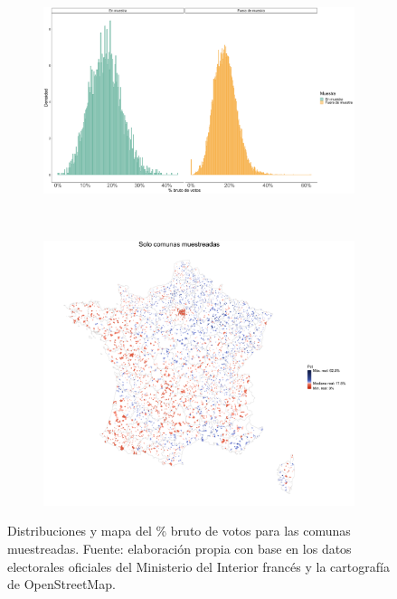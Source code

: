 \begin{figure}[h]
	\centering
	\begin{subfigure}{0.45\textwidth}
	\includegraphics[width = \textwidth]{Figs/AED/Distr_Votos_Br_P12_FN_MUESTRA}
	\caption{}
	\label{fig:Compara_Distr_Muestra}		
	\end{subfigure}\\
	\begin{subfigure}{0.45\textwidth}
	\includegraphics[width = \textwidth]{Figs/AED/Mapa_Votos_Br_P12_FN_MUESTRA}
	\caption{}
	\label{fig:Mapa_Comunas_Muestra}
	\end{subfigure}
	\caption{Distribuciones y mapa del \% bruto de votos para las comunas muestreadas. Fuente: elaboración propia con base en los datos electorales oficiales del Ministerio del Interior francés y la cartografía de OpenStreetMap.}
\end{figure}

